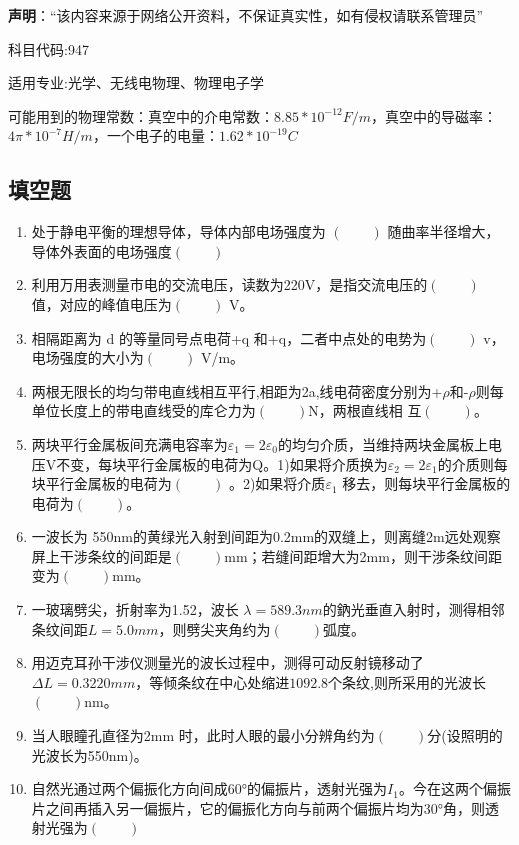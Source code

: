 
\textbf{声明}：“该内容来源于网络公开资料，不保证真实性，如有侵权请联系管理员”


科目代码:947


适用专业:光学、无线电物理、物理电子学


可能用到的物理常数：真空中的介电常数：$8.85*10^{-12}F/m$，真空中的导磁率：$4\pi*10^{-7}H/m$，一个电子的电量：$1.62*10^{-19}C$
\subsection{填空题}
\begin{enumerate}
\item  处于静电平衡的理想导体，导体内部电场强度为 $(\qquad)$ 随曲率半径增大，导体外表面的电场强度$(\qquad)$ 
\item 利用万用表测量市电的交流电压，读数为220V，是指交流电压的$(\qquad)$ 值，对应的峰值电压为$(\qquad)$ V。
\item 相隔距离为 d 的等量同号点电荷+q 和+q，二者中点处的电势为$(\qquad)$ v，电场强度的大小为$(\qquad)$ V/m。
\item 两根无限长的均匀带电直线相互平行,相距为2a,线电荷密度分别为+$\rho$和-$\rho$则每单位长度上的带电直线受的库仑力为$(\qquad)$N，两根直线相
互$(\qquad)$。
\item 两块平行金属板间充满电容率为$\varepsilon_1=2\varepsilon_0$的均匀介质，当维持两块金属板上电压V不变，每块平行金属板的电荷为Q。1)如果将介质换为$\varepsilon_2=2\varepsilon_1$的介质则每块平行金属板的电荷为$(\qquad)$
。2)如果将介质$\varepsilon_1$ 移去，则每块平行金属板的电荷为$(\qquad)$。
\item 一波长为 550nm的黄绿光入射到间距为0.2mm的双缝上，则离缝2m远处观察屏上干涉条纹的间距是$(\qquad)$mm；若缝间距增大为2mm，则干涉条纹间距变为$(\qquad)$mm。
\item 一玻璃劈尖，折射率为1.52，波长 $\lambda=589.3nm$的鈉光垂直入射时，测得相邻条纹间距$L=5.0mm$，则劈尖夹角约为$(\qquad)$弧度。
\item 用迈克耳孙干涉仪测量光的波长过程中，测得可动反射镜移动了$\Delta L=0.3220mm$，等倾条纹在中心处缩进$1092.8$个条纹,则所采用的光波长$(\qquad)$nm。
\item 当人眼瞳孔直径为2mm 时，此时人眼的最小分辨角约为$(\qquad)$分(设照明的光波长为550nm)。
\item 自然光通过两个偏振化方向间成60°的偏振片，透射光强为$I_1$。今在这两个偏振片之间再插入另一偏振片，它的偏振化方向与前两个偏振片均为30°角，则透射光强为$(\qquad)$
\end{enumerate}
